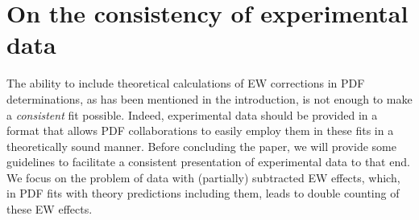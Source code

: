 \section{On the consistency of experimental data}
\label{sec:doublecounting}

The ability to include theoretical calculations of EW corrections in
PDF determinations, as has been mentioned in the introduction, is not enough to make a \emph{consistent} fit possible. Indeed, experimental data should
be provided in a format that allows PDF collaborations to easily employ them in these fits in a theoretically sound manner. Before concluding the paper,
we will provide some guidelines to facilitate a consistent presentation of experimental data to that end. We focus on the problem of data with (partially) subtracted EW effects, which, in PDF fits with theory predictions including them, leads to double counting of these EW effects.

